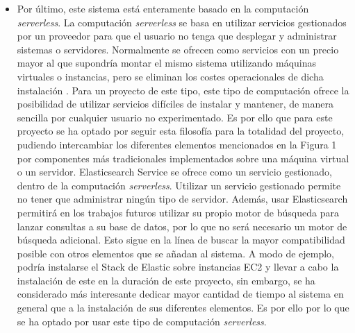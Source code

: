 \documentclass[../../memoria.tex]{subfiles}
\begin{document}
\begin{itemize}
    \item Por último, este sistema está enteramente basado en la computación \textit{serverless}. La computación \textit{serverless} se basa en utilizar servicios gestionados por un proveedor para que el usuario no tenga que desplegar y administrar sistemas o servidores. Normalmente se ofrecen como servicios con un precio mayor al que supondría montar el mismo sistema utilizando máquinas virtuales o instancias, pero se eliminan los costes operacionales de dicha instalación \cite{awsserverless}. Para un proyecto de este tipo, este tipo de computación ofrece la posibilidad de utilizar servicios difíciles de instalar y mantener, de manera sencilla por cualquier usuario no experimentado. Es por ello que para este proyecto se ha optado por seguir esta filosofía para la totalidad del proyecto, pudiendo intercambiar los diferentes elementos mencionados en la Figura 1 por componentes más tradicionales implementados sobre una máquina virtual o un servidor. Elasticsearch Service se ofrece como un servicio gestionado, dentro de la computación \textit{serverless}. Utilizar un servicio gestionado permite no tener que administrar ningún tipo de servidor. Además, usar Elasticsearch permitirá en los trabajos futuros utilizar su propio motor de búsqueda para lanzar consultas a su base de datos, por lo que no será necesario un motor de búsqueda adicional. Esto sigue en la línea de buscar la mayor compatibilidad posible con otros elementos que se añadan al sistema. A modo de ejemplo, podría instalarse el Stack de Elastic sobre instancias EC2 y llevar a cabo la instalación de este en la duración de este proyecto, sin embargo, se ha considerado más interesante dedicar mayor cantidad de tiempo al sistema en general que a la instalación de sus diferentes elementos. Es por ello por lo que se ha optado por usar este tipo de computación \textit{serverless}.
\end{itemize}
\end{document}
